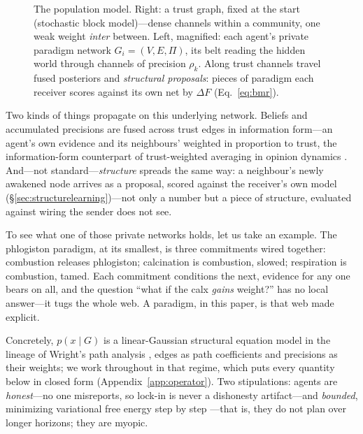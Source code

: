 \documentclass[runningheads]{llncs}
\begin{document}
\begin{figure}[h!]
{}
\caption{The population model. Right: a trust graph, fixed at the start (stochastic block
model)---dense channels within a community, one weak weight \emph{inter} between. Left,
magnified: each agent's private paradigm network $G_i=(V,E,\Pi)$, its belt reading the hidden
world through channels of precision $\rho_k$. Along trust channels travel fused posteriors and
\emph{structural proposals}: pieces of paradigm each receiver scores against its own net by
$\Delta F$ (Eq.~\ref{eq:bmr}).}
\label{fig:population}
\end{figure}

Two kinds of things propagate on this underlying network. Beliefs and accumulated precisions
are fused across trust edges in information form---an agent's own evidence and its neighbours'
weighted in proportion to trust, the information-form counterpart of trust-weighted averaging
in opinion dynamics \citep{degroot1974,acemoglu2011}. And---not standard---\emph{structure}
spreads the same way: a neighbour's newly awakened node arrives as a proposal, scored against
the receiver's own model (\S\ref{sec:structurelearning})---not only a number but a piece of
structure, evaluated against wiring the sender does not see.

To see what one of those private networks holds, let us take an example. The
phlogiston paradigm, at its smallest, is three commitments wired together:
combustion releases phlogiston; calcination is combustion, slowed; respiration is combustion,
tamed. Each commitment conditions the next, evidence for any one bears on all, and the question
``what if the calx \emph{gains} weight?'' has no local answer---it tugs the whole web. A
paradigm, in this paper, is that web made explicit.

Concretely, $p(x\mid G)$ is a linear-Gaussian structural equation model in the lineage of
Wright's path analysis \citep{wright1934}, edges as path coefficients and precisions as their
weights; we work throughout in that regime, which puts every quantity below in closed form
(Appendix~\ref{app:operator}). Two stipulations: agents are \emph{honest}---no one misreports,
so lock-in is never a dishonesty artifact---and \emph{bounded}, minimizing variational free
energy step by step \citep{dacosta2020}---that is, they do not plan over longer horizons; they
are myopic.
\end{document}
